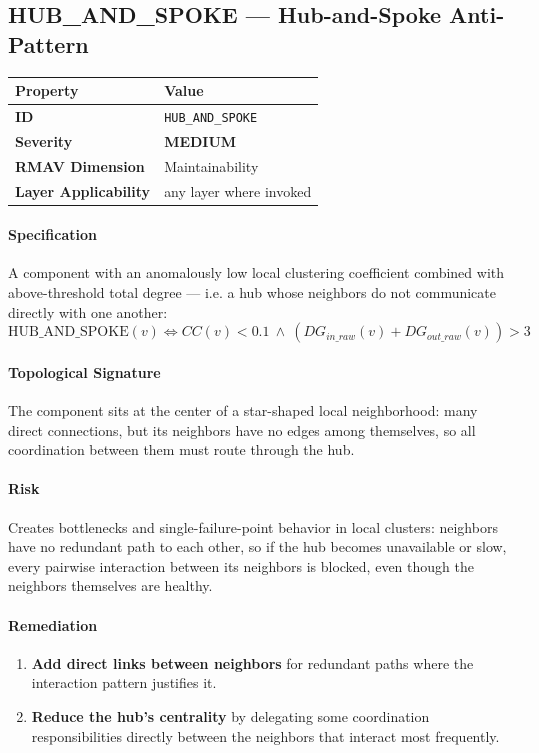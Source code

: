 \documentclass[11pt]{article}
\makeatletter
\newcommand{\MEDIUM}{\textcolor{yellow!50!black}{\textbf{MEDIUM}}}
\newcommand{\patternprop}[4]{%
  \begin{center}
  \begin{tabular}{@{}ll@{}}
  \toprule
  \textbf{Property} & \textbf{Value} \\
  \midrule
  \textbf{ID} & \texttt{#1} \\
  \textbf{Severity} & #2 \\
  \textbf{RMAV Dimension} & #3 \\
  \textbf{Layer Applicability} & #4 \\
  \bottomrule
  \end{tabular}
  \end{center}
}
\makeatother
\begin{document}
\subsection{HUB\_AND\_SPOKE --- Hub-and-Spoke Anti-Pattern}
\patternprop{HUB\_AND\_SPOKE}{\MEDIUM}{Maintainability}{any layer where invoked}

\paragraph{Specification}
A component with an anomalously low local clustering coefficient combined with above-threshold total degree --- i.e. a hub whose neighbors do not communicate directly with one another:
\[
\mathrm{HUB\_AND\_SPOKE}(v) \Leftrightarrow CC(v) < 0.1\ \land\ (DG_{in\_raw}(v) + DG_{out\_raw}(v)) > 3
\]

\paragraph{Topological Signature}
The component sits at the center of a star-shaped local neighborhood: many direct connections, but its neighbors have no edges among themselves, so all coordination between them must route through the hub.

\paragraph{Risk}
Creates bottlenecks and single-failure-point behavior in local clusters: neighbors have no redundant path to each other, so if the hub becomes unavailable or slow, every pairwise interaction between its neighbors is blocked, even though the neighbors themselves are healthy.

\paragraph{Remediation}
\begin{enumerate}[leftmargin=*]
\item \textbf{Add direct links between neighbors} for redundant paths where the interaction pattern justifies it.
\item \textbf{Reduce the hub's centrality} by delegating some coordination responsibilities directly between the neighbors that interact most frequently.
\end{enumerate}
\end{document}
